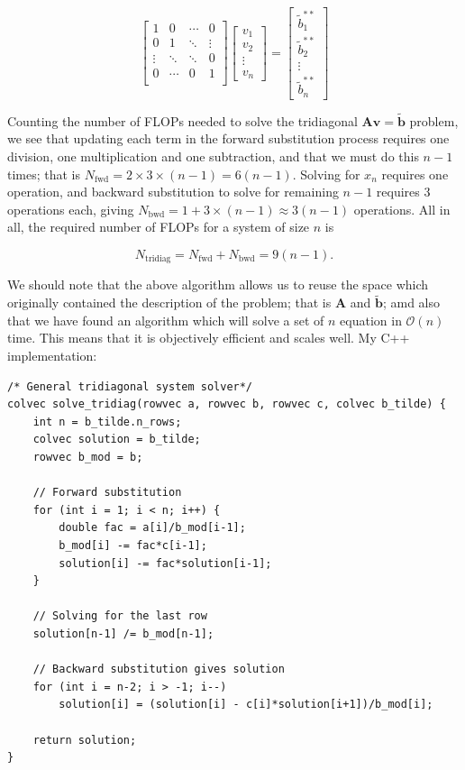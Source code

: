 \documentclass[]{article}
\begin{document}
\begin{equation*}
\left[ \begin{matrix}
1 & 0 & \cdots & 0 \\
0 & 1 & \ddots & \vdots \\
\vdots & \ddots & \ddots & 0\\
0 & \cdots & 0 & 1 \\
\end{matrix} \right]
\left[ \begin{matrix}
v_1 \\
v_2 \\
\vdots \\
v_n
\end{matrix} \right] = 
\left[ \begin{matrix}
\tilde{b}_{1}^{\ast\ast} \\
\tilde{b}_{2}^{\ast\ast} \\
\vdots \\
\tilde{b}_{n}^{\ast\ast}
\end{matrix} \right]
\end{equation*}

Counting the number of FLOPs needed to solve the tridiagonal $\mathbf{Av} = \mathbf{\tilde{b}}$ problem, we see that updating each term in the forward substitution process requires one division, one multiplication and one subtraction, and that we must do this $n-1$ times; that is $N_{\text{fwd}} = 2 \times 3 \times (n-1) = 6(n-1)$. Solving for $x_n$ requires one operation, and backward substitution to solve for remaining $n-1$ requires 3 operations each, giving $N_{\text{bwd}} = 1 + 3 \times (n-1) \approx 3(n-1)$ operations. All in all, the required number of FLOPs for a system of size $n$ is

\begin{equation*}
N_{\text{tridiag}} = N_{\text{fwd}} + N_{\text{bwd}} = 9(n-1).
\end{equation*}

We should note that the above algorithm allows us to reuse the space which originally contained the description of the problem; that is $\mathbf{A}$ and $\mathbf{\tilde{b}}$; amd also that we have found an algorithm which will solve a set of $n$ equation in $\mathcal{O}(n)$ time. This means that it is objectively efficient and scales well. My C++ implementation: 

\begin{lstlisting}
/* General tridiagonal system solver*/
colvec solve_tridiag(rowvec a, rowvec b, rowvec c, colvec b_tilde) {
	int n = b_tilde.n_rows;
	colvec solution = b_tilde;
	rowvec b_mod = b;
	
	// Forward substitution
	for (int i = 1; i < n; i++) {
		double fac = a[i]/b_mod[i-1];
		b_mod[i] -= fac*c[i-1];
		solution[i] -= fac*solution[i-1];
	}
	
	// Solving for the last row
	solution[n-1] /= b_mod[n-1];
	
	// Backward substitution gives solution
	for (int i = n-2; i > -1; i--)
		solution[i] = (solution[i] - c[i]*solution[i+1])/b_mod[i];
	
	return solution;
}
\end{lstlisting}
\end{document}
